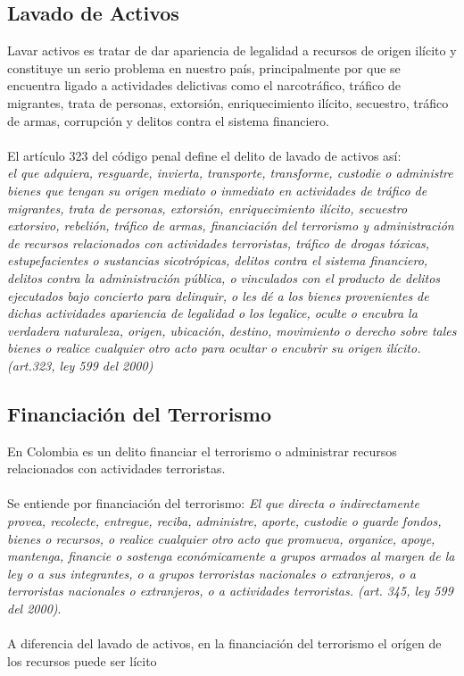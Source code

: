 \documentclass[letterpaper,12pt, spanish]{article}
\begin{document}
\subsection{Lavado de Activos}

Lavar activos es tratar de dar apariencia de legalidad a recursos de origen ilícito y constituye un serio problema en nuestro país, principalmente por que se encuentra ligado a actividades delictivas como el narcotráfico, tráfico de migrantes, trata de personas, extorsión, enriquecimiento ilícito, secuestro, tráfico de armas, corrupción y delitos contra el sistema financiero.
\ \\
\ \\
El artículo 323 del  código penal define el delito de lavado de activos así:
\ \\
\textit{el que adquiera, resguarde, invierta, transporte, transforme, custodie o administre bienes que tengan su origen mediato o inmediato en actividades de tráfico de migrantes, trata de personas, extorsión, enriquecimiento ilícito, secuestro extorsivo, rebelión, tráfico de armas, financiación del terrorismo y administración de recursos relacionados con actividades terroristas, tráfico de drogas tóxicas, estupefacientes o sustancias sicotrópicas, delitos contra el sistema financiero, delitos contra la administración pública, o vinculados con el producto de delitos ejecutados bajo concierto para delinquir, o les dé a los bienes provenientes de dichas actividades apariencia de legalidad o los legalice, oculte o encubra la verdadera naturaleza, origen, ubicación, destino, movimiento o derecho sobre tales bienes o realice cualquier otro acto para ocultar o encubrir su origen ilícito. (art.323, ley 599 del 2000)}

\subsection{Financiación del Terrorismo}

En Colombia es un delito financiar el terrorismo o administrar recursos relacionados con actividades terroristas.
\ \\
\ \\
Se entiende por financiación del terrorismo: \emph{El que directa o indirectamente provea, recolecte, entregue, reciba, administre, aporte, custodie o guarde fondos, bienes o recursos, o realice cualquier otro acto que promueva, organice, apoye, mantenga, financie o sostenga económicamente a grupos armados al margen de la ley o a sus integrantes, o a grupos terroristas nacionales o extranjeros, o a terroristas nacionales o extranjeros, o a actividades terroristas. (art. 345, ley 599 del 2000)}.
\ \\
\ \\
A diferencia del lavado de activos, en la financiación del terrorismo el orígen de los recursos puede ser lícito
\end{document}
